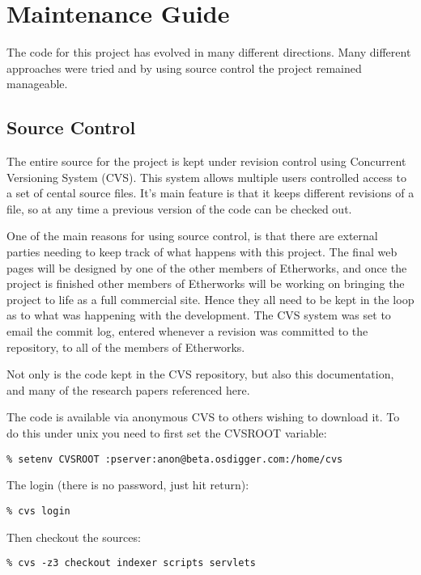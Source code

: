 
\chapter{Maintenance Guide}
The code for this project has evolved in many different directions.  Many different approaches were tried and by using source control the project remained manageable.

\section{Source Control}
The entire source for the project is kept under revision control using Concurrent Versioning System (CVS).  This system allows multiple users controlled access to a set of cental source files.  It's main feature is that it keeps different revisions of a file, so at any time a previous version of the code can be checked out.

One of the main reasons for using source control, is that there are external parties needing to keep track of what happens with this project.  The final web pages will be designed by one of the other members of Etherworks, and once the project is finished other members of Etherworks will be working on bringing the project to life as a full commercial site.  
Hence they all need to be kept in the loop as to what was happening with the development.  The CVS system was set to email the commit log, entered whenever a revision was committed to the repository, to all of the members of Etherworks.

Not only is the code kept in the CVS repository, but also this documentation, and many of the research papers referenced here.

The code is available via anonymous CVS to others wishing to download it.  To do this under unix you need to first set the CVSROOT variable:

\begin{verbatim}
% setenv CVSROOT :pserver:anon@beta.osdigger.com:/home/cvs
\end{verbatim}

The login (there is no password, just hit return):

\begin{verbatim}
% cvs login
\end{verbatim}

Then checkout the sources:

\begin{verbatim}
% cvs -z3 checkout indexer scripts servlets
\end{verbatim}



